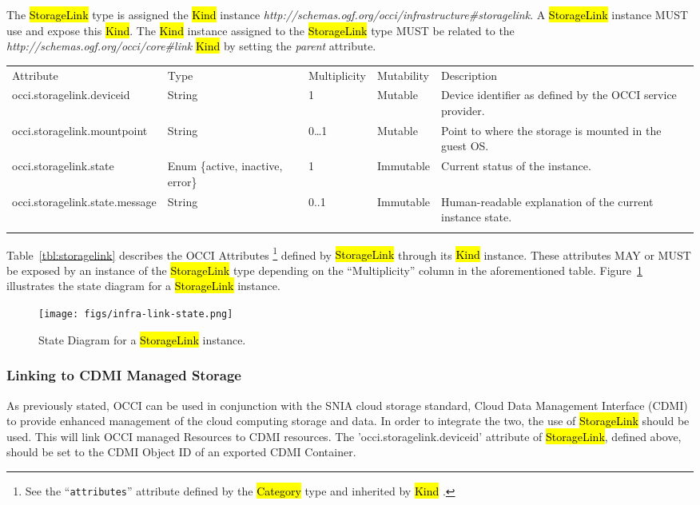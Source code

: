 \documentclass[10pt,a4paper]{article}
\begin{document}
The \hl{StorageLink} type is assigned the \hl{Kind} instance
\textit{http://schemas.ogf.org/occi/infrastructure\#storagelink}.  A
\hl{StorageLink} instance MUST use and expose this \hl{Kind}.  The
\hl{Kind} instance assigned to the \hl{StorageLink} type MUST be
related to the \textit{http://schemas.ogf.org/occi/core\#link}
\hl{Kind} by setting the \textit{parent} attribute.

{
	\begin{tabular}{lp{2.5cm}p{1cm}lp{5cm}}
	\toprule
	Attribute&Type&Multi\-plicity&Mutability&Description\\
	\colrule
	occi.storagelink.deviceid & String & 1 & Mutable
	& Device identifier as defined by the OCCI service provider.\\
	occi.storagelink.mountpoint & String & 0\ldots1 & Mutable
	& Point to where the storage is mounted in the guest OS.\\
	occi.storagelink.state & Enum \{active, inactive, error\}& 1
	& Immutable & Current status of the instance.\\
	occi.storagelink.state.message & String & 0..1 & Immutable
	& Human-readable explanation of the current instance state.\\
	\botrule
	\end{tabular}
}

Table~\ref{tbl:storagelink} describes the OCCI Attributes%
\footnote{See the ``{\tt attributes}'' attribute defined by the
  \hl{Category} type and inherited by \hl{Kind} \cite{occi:core}.}
defined by \hl{StorageLink} through its \hl{Kind} instance. These
attributes MAY or MUST be exposed by an instance of the \hl{StorageLink} type
depending on the ``Multiplicity'' column in the aforementioned table.
Figure~\ref{fig:storagelink_state} illustrates the state
diagram for a \hl{StorageLink} instance.

\begin{figure}[!h]
	\centering
	\texttt{[image: figs/infra-link-state.png]}
	\caption{State Diagram for a \hl{StorageLink} instance.}
	\label{fig:storagelink_state}
\end{figure}

\subsubsection{Linking to CDMI Managed Storage}
As previously stated, OCCI can be used in conjunction with the SNIA
cloud storage standard, Cloud Data Management Interface (CDMI)
\cite{cdmi} to provide enhanced management of the cloud computing
storage and data. In order to integrate the two, the use of
\hl{StorageLink} should be used. This will link OCCI managed Resources
to CDMI resources. The 'occi.storagelink.deviceid' attribute of
\hl{StorageLink}, defined above, should be set to the CDMI Object ID
of an exported CDMI Container.
\end{document}
